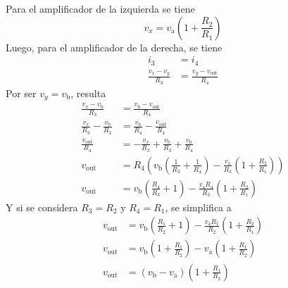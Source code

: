 Para el amplificador de la izquierda se tiene 
\[
  v_x = v_\text{a} \left(1+\frac{R_2}{R_1}\right)
\]
Luego, para el amplificador de la derecha, se tiene
\begin{align*}
  i_3&=i_4 \\ 
  \frac{v_x-v_y}{R_3}&=\frac{v_y-v_\text{out}}{R_4}
\end{align*}
Por ser \(v_y=v_\text{b}\), resulta
\begin{align*}
  \frac{v_x-v_\text{b}}{R_3}&=\frac{v_\text{b}-v_\text{out}}{R_4} \\
  \frac{v_x}{R_3} - \frac{v_\text{b}}{R_3} &= \frac{v_\text{b}}{R_4} - \frac{v_\text{out}}{R_4}\\ 
  \frac{v_\text{out}}{R_4} &= -\frac{v_x}{R_3} + \frac{v_\text{b}}{R_3} +\frac{v_\text{b}}{R_4} \\ 
  v_\text{out} &= R_4\left(v_\text{b}\left(\frac{1}{R_3}+\frac{1}{R_4}\right) - \frac{v_\text{a}}{R_3} \left(1+\frac{R_2}{R_1}\right)\right) \\
  v_\text{out} &= v_\text{b}\left(\frac{R_4}{R_3}+1\right) - \frac{v_\text{a}R_4}{R_3} \left(1+\frac{R_2}{R_1}\right)
\end{align*}
Y si se considera \(R_3=R_2\) y \(R_4=R_1\), se simplifica a 
\begin{align*}
  v_\text{out} &= v_\text{b}\left(\frac{R_1}{R_2}+1\right) - \frac{v_\text{a}R_1}{R_2} \left(1+\frac{R_2}{R_1}\right) \\
  v_\text{out} &= v_\text{b}\left(1+\frac{R_1}{R_2}\right) - v_\text{a}\left(1+\frac{R_1}{R_2}\right)\\
  v_\text{out} &= (v_\text{b} - v_\text{a})\left(1+\frac{R_1}{R_2}\right)
\end{align*}
